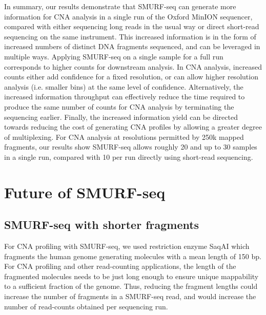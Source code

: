 In summary, our results demonstrate that SMURF-seq can generate more
information for CNA analysis in a single run of the Oxford MinION
sequencer, compared with either sequencing long reads in the usual way
or direct short-read sequencing on the same instrument.  This increased
information is in the form of increased numbers of distinct DNA
fragments sequenced, and can be leveraged in multiple ways. Applying
SMURF-seq on a single sample for a full run corresponds to higher counts
for downstream analysis. In CNA analysis, increased counts either add
confidence for a fixed resolution, or can allow higher resolution
analysis (i.e. smaller bins) at the same level of confidence.
Alternatively, the increased information throughput can effectively
reduce the time required to produce the same number of counts for CNA
analysis by terminating the sequencing earlier. Finally, the increased
information yield can be directed towards reducing the cost of
generating CNA profiles by allowing a greater degree of multiplexing.
For CNA analysis at resolutions permitted by 250k mapped fragments, our
results show SMURF-seq allows roughly 20 and up to 30 samples in a
single run, compared with 10 per run directly using short-read
sequencing.

\section{Future of SMURF-seq}
\label{future_smurf}

\subsection*{SMURF-seq with shorter fragments}
For CNA profiling with SMURF-seq, we used restriction enzyme SaqAI which
fragments the human genome generating molecules with a mean length of
150 bp. For CNA profiling and other read-counting applications, the
length of the fragmented molecules needs to be just long enough to
ensure unique mappability to a sufficient fraction of the genome. Thus,
reducing the fragment lengths could increase the number of fragments in
a SMURF-seq read, and would increase the number of read-counts obtained
per sequencing run.


